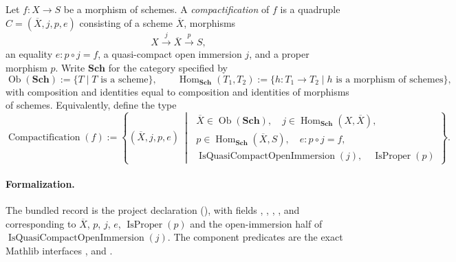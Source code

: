 \begin{definition}[Compactification] \checked
  \label{def:nagata-compactification}

  Let $f\colon X\to S$ be a morphism of schemes.  A \emph{compactification}
  of $f$ is a quadruple $C=(\overline X,j,p,e)$ consisting of a scheme
  $\overline X$, morphisms
  \[
    X\xrightarrow{j}\overline X\xrightarrow{p}S,
  \]
  an equality $e\colon p\circ j=f$, a quasi-compact open immersion $j$, and
  a proper morphism $p$.
  Write $\mathbf{Sch}$ for the category specified by
  \[
    \operatorname{Ob}(\mathbf{Sch})
      :=\{T\mid T\text{ is a scheme}\},\qquad
    \operatorname{Hom}_{\mathbf{Sch}}(T_1,T_2)
      :=\{h\colon T_1\to T_2\mid h\text{ is a morphism of schemes}\},
  \]
  with composition and identities equal to composition and identities of
  morphisms of schemes.  Equivalently, define the type
  \[
    \operatorname{Compactification}(f)
      :=\left\{(\overline X,j,p,e)\ \middle|\;
      \begin{array}{l}
        \overline X\in\operatorname{Ob}(\mathbf{Sch}),\quad
        j\in\operatorname{Hom}_{\mathbf{Sch}}(X,\overline X),\\
        p\in\operatorname{Hom}_{\mathbf{Sch}}(\overline X,S),\quad
        e\colon p\circ j=f,\\
        \operatorname{IsQuasiCompactOpenImmersion}(j),\quad
        \operatorname{IsProper}(p)
      \end{array}\right\}.
  \]

  \paragraph{Formalization.}
  The bundled record is the project declaration
  \texttt{}
  (\texttt{}), with fields
  \texttt{}, \texttt{}, \texttt{},
  \texttt{}, \texttt{} and
  \texttt{} corresponding to
  $\overline X$, $p$, $j$, $e$, $\operatorname{IsProper}(p)$ and the open-immersion half of
  $\operatorname{IsQuasiCompactOpenImmersion}(j)$.  The component predicates are the exact
  Mathlib interfaces \texttt{},
  \texttt{} and \texttt{}.


\end{definition}
